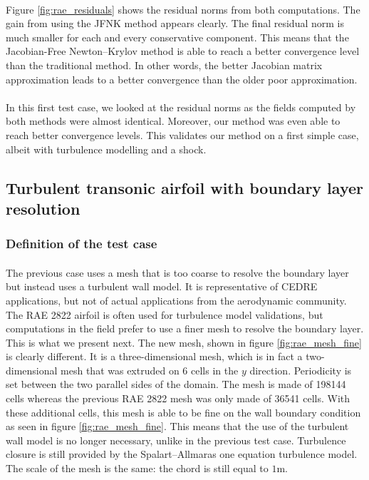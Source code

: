         \paragraph{}
        Figure \ref{fig:rae_residuals} shows the residual norms from both computations.
        The gain from using the JFNK method appears clearly.
        The final residual norm is much smaller for each and every conservative component.
        This means that the Jacobian-Free Newton--Krylov method is able to reach a better convergence level than the traditional method.
        In other words, the better Jacobian matrix approximation leads to a better convergence than the older poor approximation.

        \paragraph{}
        In this first test case, we looked at the residual norms as the fields computed by both methods were almost identical.
        Moreover, our method was even able to reach better convergence levels.
        This validates our method on a first simple case, albeit with turbulence modelling and a shock.


    \subsection{Turbulent transonic airfoil with boundary layer resolution}

      \subsubsection{Definition of the test case}

        \paragraph{}
        The previous case uses a mesh that is too coarse to resolve the boundary layer but instead uses a turbulent wall model.
        It is representative of CEDRE applications, but not of actual applications from the aerodynamic community.
        The RAE 2822 airfoil is often used for turbulence model validations, but computations in the field prefer to use a finer mesh to resolve the boundary layer.
        This is what we present next.
        The new mesh, shown in figure \ref{fig:rae_mesh_fine} is clearly different.
        It is a three-dimensional mesh, which is in fact a two-dimensional mesh that was extruded on 6 cells in the $y$ direction.
        Periodicity is set between the two parallel sides of the domain.
        The mesh is made of \num{198144} cells whereas the previous RAE 2822 mesh was only made of \num{36541} cells.
        With these additional cells, this mesh is able to be fine on the wall boundary condition as seen in figure \ref{fig:rae_mesh_fine}.
        This means that the use of the turbulent wall model is no longer necessary, unlike in the previous test case.
        Turbulence closure is still provided by the Spalart--Allmaras one equation turbulence model.
        The scale of the mesh is the same: the chord is still equal to $1\si{\meter}$.

